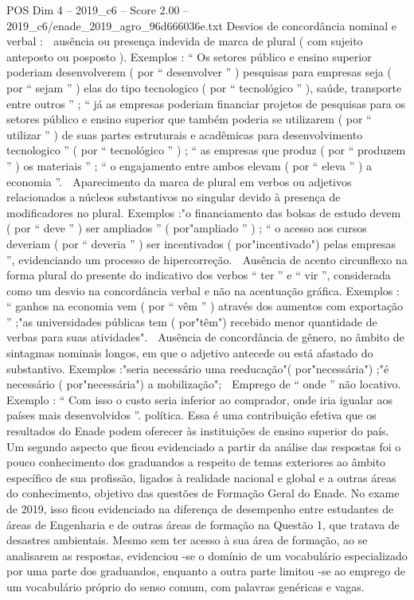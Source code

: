 \begin{textsample}{POS Dim 4 – 2019\_c6 – Score 2.00 – 2019\_c6/enade\_2019\_agro\_96d666036e.txt}
Desvios de concordância nominal e verbal :  ausência ou presença indevida de marca de plural ( com sujeito anteposto ou posposto ).
Exemplos : “ Os setores público e ensino superior poderiam desenvolverem ( por “ desenvolver ” ) pesquisas para empresas seja ( por “ sejam ” ) elas do tipo tecnologico ( por “ tecnológico ” ), saúde, transporte entre outros ” ; “ já as empresas poderiam financiar projetos de pesquisas para os setores público e ensino superior que também poderia se utilizarem ( por “ utilizar ” ) de suas partes estruturais e acadêmicas para desenvolvimento tecnologico ” ( por “ tecnológico ” ) ; “ as empresas que produz ( por “ produzem ” ) os materiais ” ; “ o engajamento entre ambos elevam ( por “ eleva ” ) a economia ”.  Aparecimento da marca de plural em verbos ou adjetivos relacionados a núcleos substantivos no singular devido à presença de modificadores no plural.
Exemplos :"o financiamento das bolsas de estudo devem ( por “ deve ” ) ser ampliados ” ( por"ampliado ” ) ; “ o acesso aos cursos deveriam ( por “ deveria ” ) ser incentivados ( por"incentivado") pelas empresas ”, evidenciando um processo de hipercorreção.  Ausência de acento circunflexo na forma plural do presente do indicativo dos verbos “ ter ” e “ vir ”, considerada como um desvio na concordância verbal e não na acentuação gráfica.
Exemplos : “ ganhos na economia vem ( por “ vêm ” ) através dos aumentos com exportação ” ;"as universidades públicas tem ( por"têm") recebido menor quantidade de verbas para suas atividades".  Ausência de concordância de gênero, no âmbito de sintagmas nominais longos, em que o adjetivo antecede ou está afastado do substantivo.
Exemplos :"seria necessário uma reeducação"( por"necessária") ;"é necessário ( por"necessária") a mobilização";  Emprego de “ onde ” não locativo.
Exemplo : “ Com isso o custo seria inferior ao comprador, onde iria igualar aos países mais desenvolvidos ”. política.
Essa é uma contribuição efetiva que os resultados do Enade podem oferecer às instituições de ensino superior do país.
Um segundo aspecto que ficou evidenciado a partir da análise das respostas foi o pouco conhecimento dos graduandos a respeito de temas exteriores ao âmbito específico de sua profissão, ligados à realidade nacional e global e a outras áreas do conhecimento, objetivo das questões de Formação Geral do Enade.
No exame de 2019, isso ficou evidenciado na diferença de desempenho entre estudantes de áreas de Engenharia e de outras áreas de formação na Questão 1, que tratava de desastres ambientais.
Mesmo sem ter acesso à sua área de formação, ao se analisarem as respostas, evidenciou -se o domínio de um vocabulário especializado por uma parte dos graduandos, enquanto a outra parte limitou -se ao emprego de um vocabulário próprio do senso comum, com palavras genéricas e vagas.

\end{textsample}
